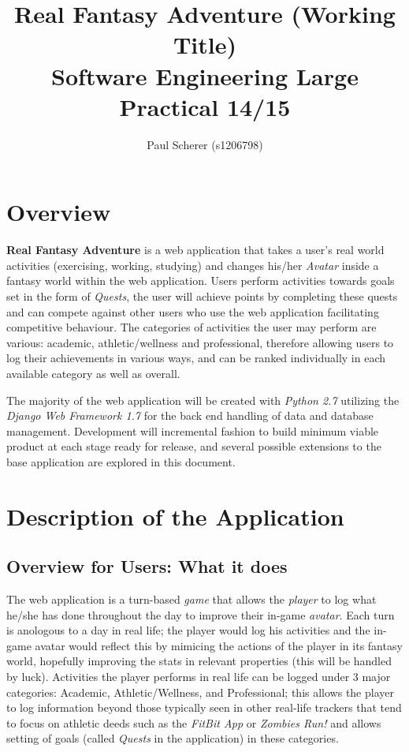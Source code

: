 \documentclass[11pt, a4paper]{article}
\begin{document}
\title{Real Fantasy Adventure (Working Title) \\
Software Engineering Large Practical 14/15}
\author{Paul Scherer (s1206798)}
\maketitle
\newpage

\tableofcontents
\newpage

\section{Overview}
\textbf{Real Fantasy Adventure} is a web application that takes a user's real world activities (exercising, working, studying) and changes his/her \textit{Avatar} inside a fantasy world within the web application. Users perform activities towards goals set in the form of \textit{Quests}, the user will achieve points by completing these quests and can compete against other users who use the web application facilitating competitive behaviour. The categories of activities the user may perform are various: academic, athletic/wellness and professional, therefore allowing users to log their achievements in various ways, and can be ranked individually in each available category as well as overall. 

The majority of the web application will be created with \textit{Python 2.7} utilizing the \textit{Django Web Framework 1.7} for the back end handling of data and database management. Development will incremental fashion to build minimum viable product at each stage ready for release, and several possible extensions to the base application are explored in this document.

\section{Description of the Application}
\subsection{Overview for Users: What it does}

The web application is a turn-based \textit{game} that allows the \textit{player} to log what he/she has done throughout the day to improve their in-game \textit{avatar}. Each turn is anologous to a day in real life; the player would log his activities and the in-game avatar would reflect this by mimicing the actions of the player in its fantasy world, hopefully improving the stats in relevant properties (this will be handled by luck). Activities the player performs in real life can be logged under 3 major categories: Academic, Athletic/Wellness, and Professional; this allows the player to log information beyond those typically seen in other real-life trackers that tend to focus on athletic deeds such as the \textit{FitBit App} or \textit{Zombies Run!} and allows setting of goals (called \textit{Quests} in the application) in these categories. 
\end{document}
